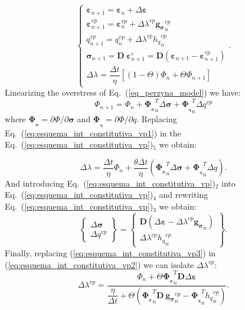 \documentclass[Journal,letterpaper]{ascelike-new}
\newcommand{\dgds}{\boldsymbol{g_\sigma}}
\newcommand{\dPhidsl}{\boldsymbol{\Phi_{_\sigma}}}
\newcommand{\dPhidql}{\boldsymbol{\Phi_{_q}}}
\newcommand{\Dsdee}{\boldsymbol{D}}
\newcommand{\hl}{{h_q}}
\newcommand{\strain}{\boldsymbol{\varepsilon}}
\newcommand{\stress}{\boldsymbol{\sigma}}
\begin{document}
\begin{equation}
	\label{eq:esquema_int_constitutiva_vp}
	\left\{
	\begin{array}{lcl}
		\strain_{n+1} = \strain_n + \Delta \strain \\
		\strain_{n+1}^{vp} = \strain_n^{vp} + \Delta \lambda^{vp} \dgds_n^{vp} \\
		q_{n+1}^{vp} = q_n^{vp} + \Delta \lambda^{vp} \hl_n^{vp} \\	
		\stress_{n+1} = \Dsdee~\strain_{n+1}^e = \Dsdee(\strain_{n+1} - \strain_{n+1}^{vp}) \\
		\Delta \lambda = \dfrac{\Delta t}{\eta}[(1-\Theta)\Phi_n + \Theta \Phi_{n+1}]
	\end{array}
	\right..
\end{equation}
Linearizing the overstress of Eq.~(\ref{eq_perzyna_model}) we have:
\begin{equation}
	\label{eq:esquema_int_constitutiva_vp1}
	\Phi_{n+1} = \Phi_n + \dPhidsl_n^T \Delta \stress + \dPhidql_n^T \Delta q^{vp}
\end{equation}
where $\dPhidsl = \partial \Phi / \partial \stress$ and $\dPhidql = \partial \Phi / \partial q$. Replacing  Eq.~(\ref{eq:esquema_int_constitutiva_vp1}) in the Eq.~(\ref{eq:esquema_int_constitutiva_vp})$_5$ we obtain:

\begin{equation}
	\label{eq:esquema_int_constitutiva_vp2}
	\Delta \lambda = \dfrac{\Delta t}{\eta} \Phi_n + \dfrac{\theta \Delta t}{\eta}(\dPhidsl_n^T \Delta \stress + \dPhidql_n^T \Delta q).
\end{equation}
And introducing Eq.~(\ref{eq:esquema_int_constitutiva_vp})$_2$  into Eq.~(\ref{eq:esquema_int_constitutiva_vp})$_4$ and rewriting 
Eq.~(\ref{eq:esquema_int_constitutiva_vp})$_3$ we obtain:
\begin{equation}
	\label{eq:esquema_int_constitutiva_vp3}
	\left\{ \begin{array}{lcl} \Delta \stress \\ \Delta q^{vp} \end{array} \right\} = \left\{ \begin{array}{ccc} \Dsdee(\Delta\strain -\Delta \lambda^{vp} \dgds_n) \\ \Delta \lambda^{vp} \hl_n^{vp} \end{array} \right\}.
\end{equation}
Finally, replacing (\ref{eq:esquema_int_constitutiva_vp3}) in (\ref{eq:esquema_int_constitutiva_vp2}) we can isolate $\Delta \lambda^{vp}$:
\begin{equation}
	\label{eq:esquema_int_constitutiva_vp4}
	\Delta \lambda^{vp} = \dfrac{\Phi_n + \Theta \dPhidsl_n^T\Dsdee\Delta\strain}{\dfrac{\eta}{\Delta t} + \Theta (\dPhidsl_n^T\Dsdee~\dgds_n^{vp} - \dPhidql_n^T \hl_n^{vp})}.
\end{equation}
\end{document}
